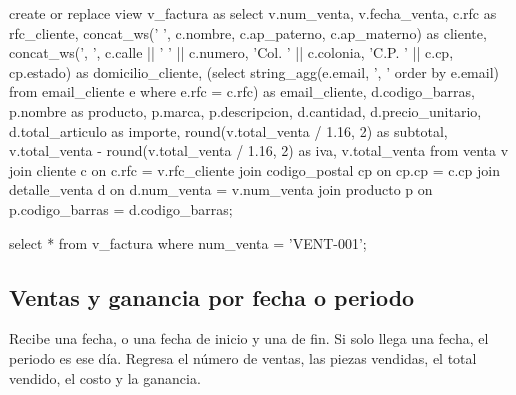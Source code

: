 \documentclass[12pt,a4paper]{article}
\begin{document}
\begin{codigo}
create or replace view v_factura as
select v.num_venta,
       v.fecha_venta,
       c.rfc                                                   as rfc_cliente,
       concat_ws(' ', c.nombre, c.ap_paterno, c.ap_materno)    as cliente,
       concat_ws(', ', c.calle || ' ' || c.numero,
                       'Col. ' || c.colonia,
                       'C.P. ' || c.cp,
                       cp.estado)                              as domicilio_cliente,
       (select string_agg(e.email, ', ' order by e.email)
          from email_cliente e
         where e.rfc = c.rfc)                                  as email_cliente,
       d.codigo_barras,
       p.nombre                                                as producto,
       p.marca,
       p.descripcion,
       d.cantidad,
       d.precio_unitario,
       d.total_articulo                                        as importe,
       round(v.total_venta / 1.16, 2)                          as subtotal,
       v.total_venta - round(v.total_venta / 1.16, 2)          as iva,
       v.total_venta
  from venta v
  join cliente c        on c.rfc = v.rfc_cliente
  join codigo_postal cp on cp.cp = c.cp
  join detalle_venta d  on d.num_venta = v.num_venta
  join producto p       on p.codigo_barras = d.codigo_barras;
\end{codigo}

\begin{codigo}
select * from v_factura where num_venta = 'VENT-001';
\end{codigo}

\subsection{Ventas y ganancia por fecha o periodo}

Recibe una fecha, o una fecha de inicio y una de fin. Si solo llega una fecha, el
periodo es ese día. Regresa el número de ventas, las piezas vendidas, el total
vendido, el costo y la ganancia.
\end{document}
